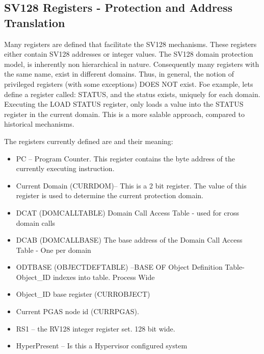 \documentclass{article}
\begin{document}
\subsection {SV128 Registers -  Protection and Address Translation}

Many registers are defined that facilitate the SV128 mechanisms.   These registers either contain SV128 addresses or integer values.  The SV128 domain protection model, is inherently non hierarchical in nature. Consequently many registers with the same name, exist in different domains. Thus, in general,  the notion of privileged registers (with some exceptions) DOES NOT exist.  Foe example,  lets define a register called:  STATUS, and the status exists, uniquely for each domain.  Executing the LOAD STATUS register,  only loads a value  into the STATUS register in the current domain.  This is a more salable approach, compared to historical mechanisms.




The registers currently defined are and their meaning:



\begin {itemize}
\item PC – Program Counter. This register contains the byte address of the currently executing instruction.
\item Current Domain  (CURRDOM)– This is a 2 bit register.  The value of this register is used to determine the current protection domain.
\item DCAT (DOMCALLTABLE) Domain Call Access Table - used for cross domain calls
\item DCAB (DOMCALLBASE) The base address of the Domain Call Access Table - One per  domain
\item ODTBASE (OBJECTDEFTABLE) –BASE OF Object Definition Table- Object\_ID indexes into table.  Process Wide
\item Object\_ID  base register (CURROBJECT)
\item Current PGAS node id (CURRPGAS).
\item RS1 – the RV128 integer register set.  128 bit wide.
\item HyperPresent – Is this a Hypervisor configured system

\end{itemize}





\pagebreak
\end{document}
